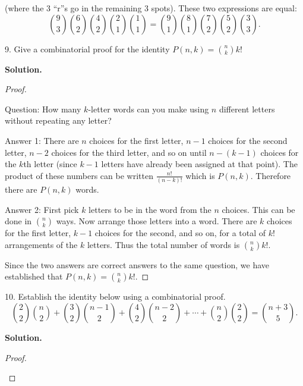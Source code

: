 \documentclass[10pt,]{book}
\theoremstyle{plain}
\theoremstyle{definition}
\theoremstyle{definition}
\theoremstyle{definition}
\numberwithin{equation}{section}
\begin{document}
\begin{exerciselist}
          (where the 3 ``r''s go in the remaining 3 spots). These two expressions are equal:
          \begin{equation*}
            {9 \choose 3}{6 \choose 2}{4 \choose 2}{2\choose 1}{1\choose 1} = {9 \choose 1}{8\choose 1}{7 \choose 2}{5\choose 2}{3\choose 3}.
          \end{equation*}
\item[9.]\hypertarget{exercise-80}{}
          Give a combinatorial proof for the identity \(P(n,k) = {n \choose k}k!\)
\par\smallskip
\par\smallskip
\noindent\textbf{Solution.}\hypertarget{solution-117}{}\quad
\begin{proof}\hypertarget{proof-11}{}

            Question: How many \(k\)-letter words can you make using \(n\) different letters without repeating any letter?
\par

            Answer 1: There are \(n\) choices for the first letter, \(n-1\) choices for the second letter, \(n-2\) choices for the third letter, and so on until \(n - (k-1)\) choices for the \(k\)th letter (since \(k-1\) letters have already been assigned at that point). The product of these numbers can be written \(\frac{n!}{(n-k)!}\) which is \(P(n,k)\).  Therefore there are \(P(n,k)\) words.
\par

            Answer 2: First pick \(k\) letters to be in the word from the \(n\) choices. This can be done in \({n \choose k}\) ways. Now arrange those letters into a word. There are \(k\) choices for the first letter, \(k-1\) choices for the second, and so on, for a total of \(k!\) arrangements of the \(k\) letters. Thus the total number of words is \({n \choose k}k!\).
\par

            Since the two answers are correct answers to the same question, we have established that \(P(n,k) = {n \choose k}k!\).
\end{proof}
\item[10.]\hypertarget{exercise-81}{}
          Establish the identity below using a combinatorial proof.
          \begin{equation*}
            {2 \choose 2}{n \choose 2} + {3 \choose 2}{n-1 \choose 2} + {4\choose 2}{n-2 \choose 2} + \cdots + {n\choose 2}{2\choose 2} = {n+3 \choose 5}.
          \end{equation*}
\par\smallskip
\par\smallskip
\noindent\textbf{Solution.}\hypertarget{solution-118}{}\quad
\begin{proof}\hypertarget{proof-12}{}


\end{proof}
\end{exerciselist}
\end{document}
